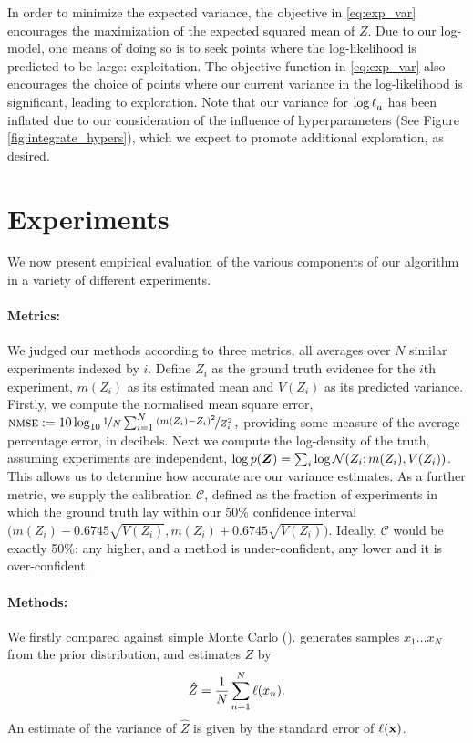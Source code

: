 \documentclass{article}
\begin{document}
In order to minimize the expected variance, the objective in \eqref{eq:exp_var} encourages the maximization of the expected squared mean of $Z$. Due to our log-\gpb model, one means of doing so is to seek points where the log-likelihood is predicted to be large: exploitation.  The objective function in \eqref{eq:exp_var} also encourages the choice of points where our current variance in the log-likelihood is significant, leading to exploration. Note that our variance for $\tr_a$ has been inflated due to our consideration of the influence of hyperparameters (See Figure \ref{fig:integrate_hypers}), which we expect to promote additional exploration, as desired.



\section{Experiments}
\label{sec:experiments}

We now present empirical evaluation of the various components of our algorithm in a variety of different experiments.

\paragraph{Metrics:} We judged our methods according to three metrics, all averages over $N$ similar experiments indexed by $i$. Define $Z_i$ as the ground truth evidence for the $i$th experiment, $m(Z_i)$ as its estimated mean  and $V(Z_i)$  as its predicted variance. Firstly, we compute the normalised mean square error,
$
\acro{nmse} \deq 10 \log_{10} \nicefrac{1}{N} \sum_{i=1}^{N} \nicefrac{(m(Z_i) - Z_i)^2}{Z_i^2}\,,
$
providing some measure of the average percentage error, in decibels. Next we compute the log-density of the truth, assuming experiments are independent,
$
\log p(\vect{Z}) = \sum_i \log \N{Z_i}{m(Z_i)}{V(Z_i)}
$. This allows us to determine how accurate are our variance estimates. As a further metric, we supply the calibration $\mathcal{C}$, defined as the fraction of experiments in which the ground truth lay within our 50\% confidence interval $\bigl(m(Z_i) - 0.6745 \sqrt{V(Z_i)}, m(Z_i) + 0.6745 \sqrt{V(Z_i)}\bigr)$. Ideally, $\mathcal{C}$ would be exactly 50\%: any higher, and a method is under-confident, any lower and it is over-confident. 

\paragraph{Methods:} We firstly compared against simple Monte Carlo ().  generates samples $x_1 \dots x_N$ from the prior distribution, and estimates $Z$ by $$\hat{Z} = \frac{1}{N} \sum_{n=1}^{N} \lfn(x_n).$$  An estimate of the variance of $\hat{Z}$ is given by the standard error of $\lfn({\bf x})$.
\end{document}
